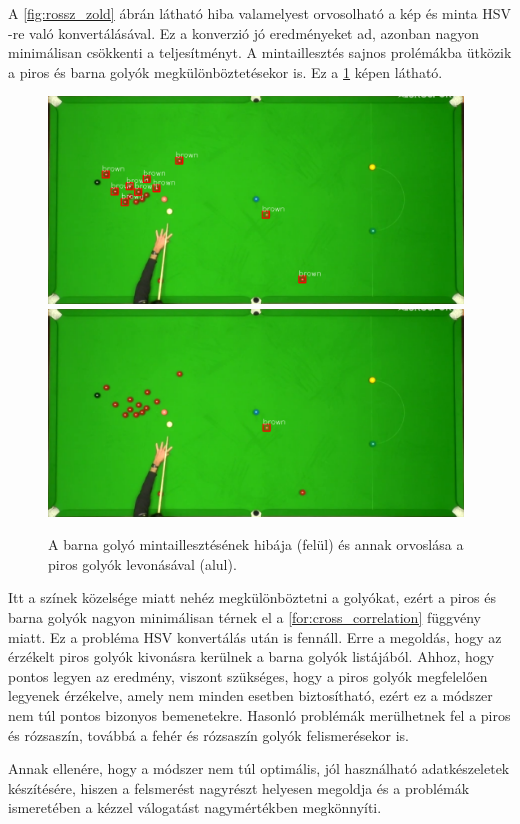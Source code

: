 \par A \ref{fig:rossz_zold} ábrán látható hiba valamelyest orvosolható a kép és minta HSV -re való konvertálásával. Ez a konverzió jó eredményeket ad, azonban nagyon minimálisan csökkenti a teljesítményt. A mintaillesztés sajnos prolémákba ütközik a piros és barna golyók megkülönböztetésekor is. Ez a \ref{fig:rossz_barna} képen látható.

\begin{figure}[!ht]
    \centering
    \includegraphics[width=110mm, keepaspectratio]{figures/wrong_brown.png}\hspace{2mm}
	\includegraphics[width=110mm, keepaspectratio]{figures/brown_ok.png}
    \caption{A barna golyó mintaillesztésének hibája (felül) és annak orvoslása a piros golyók levonásával (alul).}
    \label{fig:rossz_barna}
\end{figure}

\par Itt a színek közelsége miatt nehéz megkülönböztetni a golyókat, ezért a piros és barna golyók nagyon minimálisan térnek el a \ref{for:cross_correlation} függvény miatt. Ez a probléma HSV konvertálás után is fennáll. Erre a megoldás, hogy az érzékelt piros golyók kivonásra kerülnek a barna golyók listájából. Ahhoz, hogy pontos legyen az eredmény, viszont szükséges, hogy a piros golyók megfelelően legyenek érzékelve, amely nem minden esetben biztosítható, ezért ez a módszer nem túl pontos bizonyos bemenetekre. Hasonló problémák merülhetnek fel a piros és rózsaszín, továbbá a fehér és rózsaszín golyók felismerésekor is.
\par Annak ellenére, hogy a módszer nem túl optimális, jól használható adatkészeletek készítésére, hiszen a felsmerést nagyrészt helyesen megoldja és a problémák ismeretében a kézzel válogatást nagymértékben megkönnyíti.


